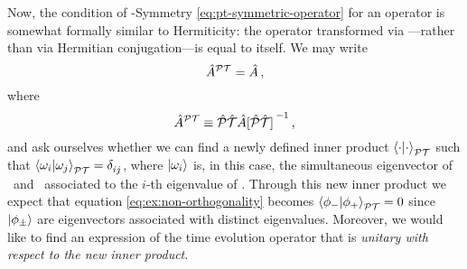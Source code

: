             Now, the condition of \PT-Symmetry \eqref{eq:pt-symmetric-operator} for an operator is somewhat formally similar to Hermiticity: the operator transformed via \hPT---rather than via Hermitian conjugation---is equal to itself. We may write
            \begin{equation*}
                \hat{A}^{\mathcal{P}\mathcal{T}} = \hat{A}
                \,\text{,}
            \end{equation*}
            where
            \begin{equation*}
                \hA^{\PT} \equiv \PTtransform{\hA}
                \mycomma
            \end{equation*}
            and ask ourselves whether we can find a newly defined inner product $\braket{\cdot}{\cdot}_{\mathcal{P}\mathcal{T}}$ such that $\braket{\omega_i}{\omega_j}_{\PT}= \tensor{\delta}{_i_j}$, where $\ket{\omega_i}$ is, in this case, the simultaneous eigenvector of \hA\ and \hPT\ associated to the $i$-th eigenvalue of \hA. Through this new inner product we expect that equation \eqref{eq:ex:non-orthogonality} becomes $\braket{\phi_-}{\phi_+}_{\mathcal{P}\mathcal{T}} = 0$ since $\ket{\phi_\pm}$ are eigenvectors associated with distinct eigenvalues. Moreover, we would like to find an expression of the time evolution operator that is \emph{unitary with respect to the new inner product}.

